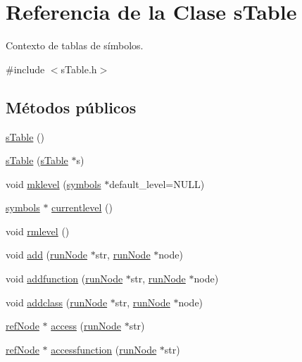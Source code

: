 \hypertarget{classsTable}{\section{Referencia de la Clase s\-Table}
\label{classsTable}
}


Contexto de tablas de símbolos.  




{\ttfamily \#include $<$s\-Table.\-h$>$}

\subsection*{Métodos públicos}
\begin{DoxyCompactItemize}
\item 
\hyperlink{classsTable_aa49680811a00fdc1ed3c5c6d6f897f5c}{s\-Table} ()
\item 
\hyperlink{classsTable_a94e2bc853ab9d66eac74299d83c26a27}{s\-Table} (\hyperlink{classsTable}{s\-Table} $\ast$s)
\item 
void \hyperlink{classsTable_aa547c576101026db1b4db5ce10d93153}{mklevel} (\hyperlink{classsymbolsTable}{symbols} $\ast$default\-\_\-level=N\-U\-L\-L)
\item 
\hyperlink{classsymbolsTable}{symbols} $\ast$ \hyperlink{classsTable_aa3625d4ea455f68e3387f8df76b284b2}{currentlevel} ()
\item 
void \hyperlink{classsTable_a2633260b2d4749f726dd1024af528648}{rmlevel} ()
\item 
void \hyperlink{classsTable_ab4b189e89f314dfd49b7597b1602fad1}{add} (\hyperlink{classrunNode}{run\-Node} $\ast$str, \hyperlink{classrunNode}{run\-Node} $\ast$node)
\item 
void \hyperlink{classsTable_ae5775575a308bed2519d4d1df536e394}{addfunction} (\hyperlink{classrunNode}{run\-Node} $\ast$str, \hyperlink{classrunNode}{run\-Node} $\ast$node)
\item 
void \hyperlink{classsTable_ad6c4483ab1c03f49d6c74082af4bec81}{addclass} (\hyperlink{classrunNode}{run\-Node} $\ast$str, \hyperlink{classrunNode}{run\-Node} $\ast$node)
\item 
\hyperlink{classrefNode}{ref\-Node} $\ast$ \hyperlink{classsTable_a189bea4924d3909768828ab801da35f1}{access} (\hyperlink{classrunNode}{run\-Node} $\ast$str)
\item 
\hyperlink{classrefNode}{ref\-Node} $\ast$ \hyperlink{classsTable_af62e21512f5ee4e0b20e65e576e25594}{accessfunction} (\hyperlink{classrunNode}{run\-Node} $\ast$str)

\end{DoxyCompactItemize}
